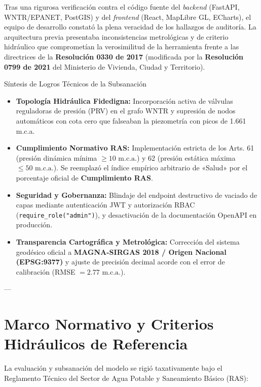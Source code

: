 \documentclass[11pt,letterpaper]{article}
\begin{document}
Tras una rigurosa verificación contra el código fuente del \textit{backend} (FastAPI, WNTR/EPANET, PostGIS) y del \textit{frontend} (React, MapLibre GL, ECharts), el equipo de desarrollo constató la plena veracidad de los hallazgos de auditoría. La arquitectura previa presentaba inconsistencias metrológicas y de criterio hidráulico que comprometían la verosimilitud de la herramienta frente a las directrices de la \textbf{Resolución 0330 de 2017} (modificada por la \textbf{Resolución 0799 de 2021} del Ministerio de Vivienda, Ciudad y Territorio).

\begin{resumenbox}{Síntesis de Logros Técnicos de la Subsanación}
\begin{itemize}
    \item \textbf{Topología Hidráulica Fidedigna:} Incorporación activa de válvulas reguladoras de presión (PRV) en el grafo WNTR y supresión de nodos automáticos con cota cero que falseaban la piezometría con picos de 1.661 m.c.a.
    \item \textbf{Cumplimiento Normativo RAS:} Implementación estricta de los Arts. 61 (presión dinámica mínima $\ge 10\text{ m.c.a.}$) y 62 (presión estática máxima $\le 50\text{ m.c.a.}$). Se reemplazó el índice empírico arbitrario de «Salud» por el porcentaje oficial de \textbf{Cumplimiento RAS}.
    \item \textbf{Seguridad y Gobernanza:} Blindaje del endpoint destructivo de vaciado de capas mediante autenticación JWT y autorización RBAC (\texttt{require\_role("admin")}), y desactivación de la documentación OpenAPI en producción.
    \item \textbf{Transparencia Cartográfica y Metrológica:} Corrección del sistema geodésico oficial a \textbf{MAGNA-SIRGAS 2018 / Origen Nacional (EPSG:9377)} y ajuste de precisión decimal acorde con el error de calibración (RMSE $= 2.77\text{ m.c.a.}$).
\end{itemize}
\end{resumenbox}

---

\section{Marco Normativo y Criterios Hidráulicos de Referencia}

La evaluación y subsanación del modelo se rigió taxativamente bajo el Reglamento Técnico del Sector de Agua Potable y Saneamiento Básico (RAS):
\end{document}
